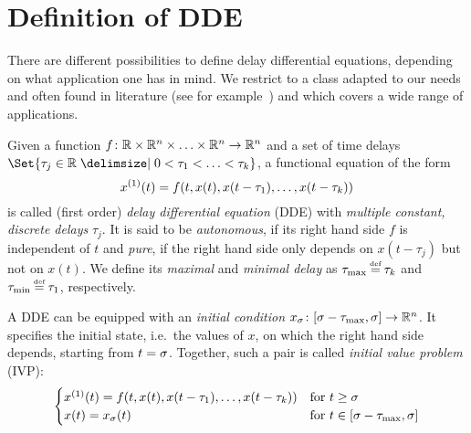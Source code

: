 \section{Definition of DDE}
    \label{sec:definition-dde}

    There are different possibilities to define delay differential equations, depending on what application one has in mind.
    We restrict to a class adapted to our needs and often found in literature (see for example~\cite{Roussel04DDEs}) and which covers a wide range of applications.

    \begin{definition}\label{def:dde}
        Given a function $f\colon\mathbb{R}\times\mathbb{R}^n\times\ldots\times\mathbb{R}^n\to\mathbb{R}^n$ and a set of time delays $\Set{\tau_j\in\R\with 0<\tau_1<\ldots<\tau_k}$, a functional equation of the form
        \begin{equation}\label{eq:dde}
            \D{x}(t) = f(t,x(t),x(t-\tau_1),\ldots,x(t-\tau_k))
        \end{equation}
        is called (first order) \emph{delay differential equation} (DDE) with \emph{multiple constant, discrete delays} $\tau_j$.
        It is said to be \emph{autonomous}, if its right hand side $f$ is independent of $t$ and \emph{pure}, if the right hand side only depends on $x(t-\tau_j)$ but not on $x(t)$.
        We define its \emph{maximal} and \emph{minimal delay} as $\taumax\defeq\tau_k$ and $\taumin\defeq\tau_1$, respectively.

        A DDE can be equipped with an \emph{initial condition} $x_{\sigma}\colon [\sigma-\tau_{\max},\sigma] \to\mathbb{R}^n$. It specifies the initial state, i.e.\ the values of $x$, on which the right hand side depends, starting from $t=\sigma$.
        Together, such a pair is called \emph{initial value problem} (IVP):
        \begin{equation}\label{eq:ivp}
            \begin{cases}
                \D{x}(t) = f(t,x(t),x(t-\tau_1),\ldots,x(t-\tau_k)) & \text{for } t\geq\tzero\\
                x(t) = x_{\tzero}(t) & \text{for } t\in\compactum{\tzero-\taumax}{\tzero}
            \end{cases}
        \end{equation}
    \end{definition}

